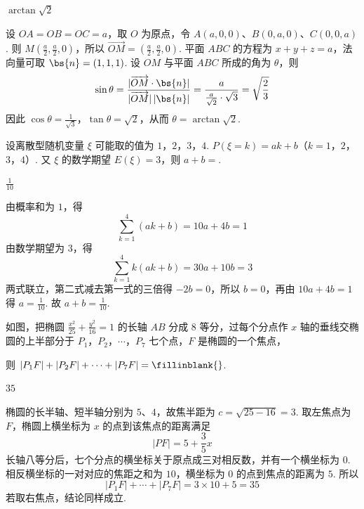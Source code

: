 \begin{answer}
\(\arctan\sqrt{2}\)
\end{answer}

\begin{solution}
设 \(OA=OB=OC=a\)，取 \(O\) 为原点，令 \(A(a,0,0)\)、\(B(0,a,0)\)、\(C(0,0,a)\). 则 \(M\left(\frac a2,\frac a2,0\right)\)，所以 \(\overrightarrow{OM}=\left(\frac a2,\frac a2,0\right)\). 平面 \(ABC\) 的方程为 \(x+y+z=a\)，法向量可取 \(\bs{n}=(1,1,1)\). 设 \(OM\) 与平面 \(ABC\) 所成的角为 \(\theta\)，则
\[
\sin\theta=\frac{|\overrightarrow{OM}\cdot\bs{n}|}{|\overrightarrow{OM}|\,|\bs{n}|}=\frac{a}{\frac{a}{\sqrt2}\cdot\sqrt3}=\sqrt{\frac23}
\]
因此 \(\cos\theta=\frac1{\sqrt3}\)，\(\tan\theta=\sqrt2\)，从而 \(\theta=\arctan\sqrt2\).
\end{solution}

\begin{problem}
设离散型随机变量 \(\xi\) 可能取的值为 \(1\)，\(2\)，\(3\)，\(4\). \(P(\xi=k)=ak+b\)（\(k=1\)，\(2\)，\(3\)，\(4\)）. 又 \(\xi\) 的数学期望 \(E(\xi)=3\)，则 \(a+b=\)\fillinblank{}.
\end{problem}

\begin{answer}
\(\frac{1}{10}\)
\end{answer}

\begin{solution}
由概率和为 \(1\)，得
\[
\sum_{k=1}^{4}(ak+b)=10a+4b=1
\]
由数学期望为 \(3\)，得
\[
\sum_{k=1}^{4}k(ak+b)=30a+10b=3
\]
两式联立，第二式减去第一式的三倍得 \(-2b=0\)，所以 \(b=0\)，再由 \(10a+4b=1\) 得 \(a=\frac1{10}\). 故 \(a+b=\frac1{10}\).
\end{solution}

\begin{problem}
如图，把椭圆 \(\frac{x^2}{25} + \frac{y^2}{16} = 1\) 的长轴 \(AB\) 分成 \(8\) 等分，过每个分点作 \(x\) 轴的垂线交椭圆的上半部分于 \(P_1\)，\(P_2\)，\(\cdots\)，\(P_7\) 七个点，\(F\) 是椭圆的一个焦点，


则 \(|P_1F| + |P_2F| + \cdots + |P_7F| =\fillinblank{}\).
\end{problem}

\begin{answer}
\(35\)
\end{answer}

\begin{solution}
椭圆的长半轴、短半轴分别为 \(5\)、\(4\)，故焦半距为 \(c=\sqrt{25-16}=3\). 取左焦点为 \(F\)，椭圆上横坐标为 \(x\) 的点到该焦点的距离满足
\[
|PF|=5+\frac35x
\]
长轴八等分后，七个分点的横坐标关于原点成三对相反数，并有一个横坐标为 \(0\). 相反横坐标的一对对应的焦距之和为 \(10\)，横坐标为 \(0\) 的点到焦点的距离为 \(5\). 所以
\[
|P_1F|+\cdots+|P_7F|=3\times10+5=35
\]
若取右焦点，结论同样成立.
\end{solution}


